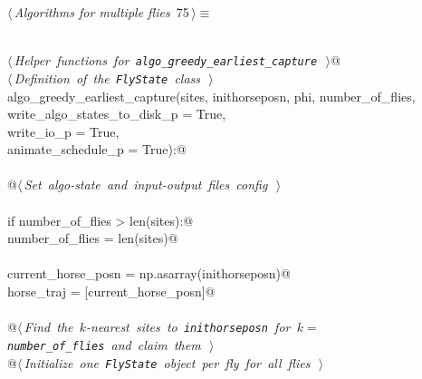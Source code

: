 \documentclass[11.5pt]{report}
\begin{document}
\begin{flushleft} \small\label{scrap112}\raggedright\small
{} $\langle\,${\itshape Algorithms for multiple flies}\nobreak\ {\footnotesize {75}}$\,\rangle\equiv$
\vspace{-1ex}
\begin{list}{}{} \item
\mbox{}\verb@@\\
\mbox{}\verb@@\hbox{$\langle\,${\itshape Helper functions for \verb|algo_greedy_earliest_capture|}\nobreak\ {\footnotesize {}}$\,\rangle$}\verb@    @\\
\mbox{}\verb@@\hbox{$\langle\,${\itshape Definition of the \verb|FlyState| class}\nobreak\ {\footnotesize {}}$\,\rangle$}\verb@@\\
\mbox{}\verb@def algo_greedy_earliest_capture(sites, inithorseposn, phi, number_of_flies,\@\\
\mbox{}\verb@                                 write_algo_states_to_disk_p = True,\@\\
\mbox{}\verb@                                 write_io_p                  = True,\@\\
\mbox{}\verb@                                 animate_schedule_p          = True):@\\
\mbox{}\verb@@\\
\mbox{}\verb@    @\hbox{$\langle\,${\itshape Set algo-state and input-output files config}\nobreak\ {\footnotesize {}}$\,\rangle$}\verb@@\\
\mbox{}\verb@@\\
\mbox{}\verb@    if number_of_flies > len(sites):@\\
\mbox{}\verb@          number_of_flies = len(sites)@\\
\mbox{}\verb@@\\
\mbox{}\verb@    current_horse_posn = np.asarray(inithorseposn)@\\
\mbox{}\verb@    horse_traj         = [current_horse_posn]@\\
\mbox{}\verb@@\\
\mbox{}\verb@    @\hbox{$\langle\,${\itshape Find the $k$-nearest sites to \verb|inithorseposn| for $k=$\verb|number_of_flies| and claim them}\nobreak\ {\footnotesize {}}$\,\rangle$}\verb@@\\
\mbox{}\verb@    @\hbox{$\langle\,${\itshape Initialize one \verb|FlyState| object per fly for all flies}\nobreak\ {\footnotesize {}}$\,\rangle$}\verb@@\\

\end{list}
\end{flushleft}
\end{document}
